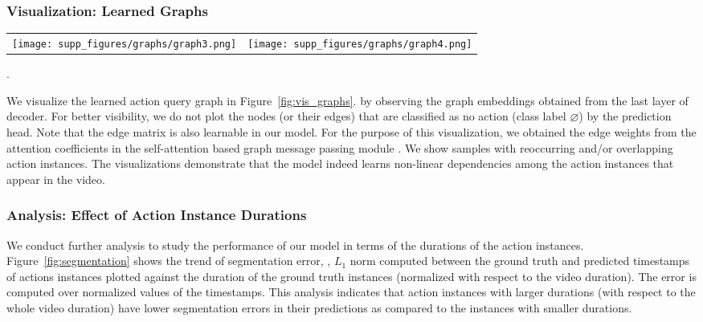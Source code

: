 \documentclass[10pt,twocolumn,letterpaper]{article}
\begin{document}
\subsubsection{Visualization: Learned Graphs}
\label{subsec:vis_graphs}
\begin{figure*}
    \begin{tabular}{c c}
        \texttt{[image: supp\_figures/graphs/graph3.png]}
         & 
         \texttt{[image: supp\_figures/graphs/graph4.png]}


\end{tabular}
    \caption{\textbf{Visualization: Learned Graphs. } Visualizations of embeddings corresponding to the last layer of the decoder and ground truth instances. The thickness of edges show the strength of interaction between the nodes. For ease of visibility, the nodes have been numbered based on the order of their predictions sorted with respect to the start time (\ie, node 0 represents the instance that starts first). These visualizations demonstrate that the model indeed learns non-linear dependencies between the action instances in a video. The legend below each figure shows the action labels corresponding to the color coded elements. For details on the visualization process, please refer to Section~\ref{subsec:vis_graphs}}.
    \label{fig:vis_graphs}
\end{figure*} We visualize the learned action query graph in Figure~\ref{fig:vis_graphs}. by observing the graph embeddings obtained from the last layer of decoder. For better visibility, we do not plot the nodes (or their edges) that are classified as no action (\ie class label $\varnothing$) by the prediction head. Note that the edge matrix is also learnable in our model. For the purpose of this visualization, we obtained the edge weights from the attention coefficients in the self-attention based graph message passing module . We show samples with reoccurring and/or overlapping action instances. The visualizations demonstrate that the model indeed learns non-linear dependencies among the action instances that appear in the video.

\subsubsection{Analysis: Effect of Action Instance Durations}\label{subsec:vis_analysis}
We conduct further analysis to study the performance of our model in terms of the durations of the action instances.
Figure~\ref{fig:segmentation} shows the trend of segmentation error, \ie, $L_1$ norm computed between the ground truth and predicted timestamps of actions instances plotted against the duration of the ground truth instances (normalized with respect to the video duration). The error is computed over normalized values of the timestamps. This analysis indicates that action instances with larger durations (with respect to the whole video duration) have lower segmentation errors in their predictions as compared to the instances with smaller durations. 
\end{document}

